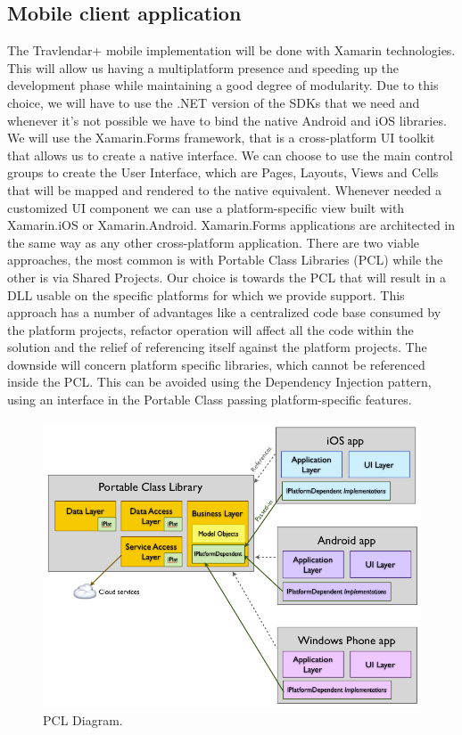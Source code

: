 \subsection*{Mobile client application}
The Travlendar+ mobile implementation will be done with Xamarin technologies. 
This will allow us having a multiplatform presence and speeding up the development phase while maintaining a good degree of modularity.
Due to this choice, we will have to use the .NET version of the SDKs that we need and whenever it's not possible we have to bind the native Android and iOS libraries.
We will use the Xamarin.Forms framework, that is a cross-platform UI toolkit that allows us to create a native interface. 
We can choose to use the main control groups to create the User Interface, which are Pages, Layouts, Views and Cells that will be mapped and rendered to the native equivalent.
Whenever needed a customized UI component we can use a platform-specific view built with Xamarin.iOS or Xamarin.Android.
Xamarin.Forms applications are architected in the same way as any other cross-platform application. 
There are two viable approaches, the most common is with Portable Class Libraries (PCL) while the other is via Shared Projects.
Our choice is towards the PCL that will result in a DLL usable on the specific platforms for which we provide support.
This approach has a number of advantages like a centralized code base consumed by the platform projects, refactor operation will affect all the code within the solution and the relief of referencing itself against the platform projects. 
The downside will concern platform specific libraries, which cannot be referenced inside the PCL. This can be avoided using the Dependency Injection pattern, using an interface in the Portable Class passing platform-specific features.
\begin{figure}[H]
	\centering
	\includegraphics[width=6in]{diagrams/PCLDiagram.png} 
	\caption{PCL Diagram.}   
\end{figure}

